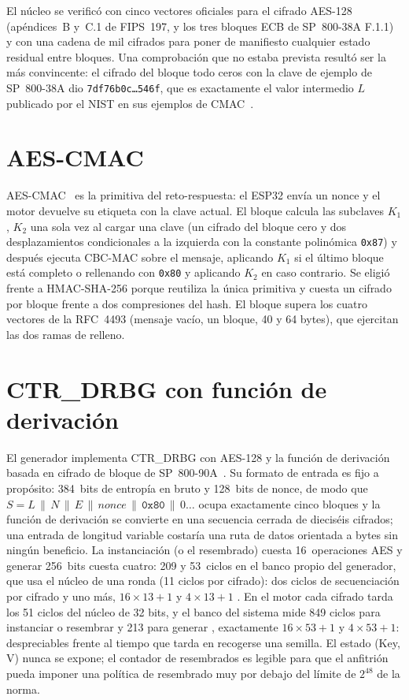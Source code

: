 El núcleo se verificó con cinco vectores oficiales para
el cifrado AES-128 (apéndices~B y~C.1 de FIPS~197, y los tres bloques ECB
de SP~800-38A F.1.1) y con una cadena de mil cifrados para poner de
manifiesto cualquier estado residual entre bloques. Una comprobación que
no estaba prevista resultó ser la más convincente: el cifrado del bloque
todo ceros con la clave de ejemplo de SP~800-38A dio
\texttt{7df76b0c\ldots546f}, que es exactamente el valor intermedio $L$
publicado por el NIST en sus ejemplos de CMAC~\cite{nist_cmac_examples}.

\section{AES-CMAC}
\label{sec:cmac}

AES-CMAC~\cite{nist_2016_sp80038b, song_2006_rfc4493} es la primitiva del
reto-respuesta: el ESP32 envía un nonce y el motor devuelve su
etiqueta con la clave actual. El bloque calcula las subclaves $K_1$,
$K_2$ una sola vez al cargar una clave (un cifrado del bloque cero y dos
desplazamientos condicionales a la izquierda con la constante polinómica
\texttt{0x87}) y después ejecuta CBC-MAC sobre el mensaje, aplicando
$K_1$ si el último bloque está completo o rellenando con \texttt{0x80} y
aplicando $K_2$ en caso contrario. Se eligió frente a HMAC-SHA-256 porque
reutiliza la única primitiva y cuesta un cifrado por bloque frente a dos
compresiones del hash. El bloque supera los cuatro vectores de la
RFC~4493 (mensaje vacío, un bloque, 40 y 64 bytes), que ejercitan las dos
ramas de relleno.

\section{CTR\_DRBG con función de derivación}
\label{sec:drbg}

El generador implementa CTR\_DRBG con AES-128 y la función de derivación
basada en cifrado de bloque de SP~800-90A~\cite{barker_2015_sp80090ar1}.
Su formato de entrada es fijo a propósito: 384~bits de entropía en bruto
y 128~bits de nonce, de modo que $S = L\,\|\,N\,\|\,E\,\|\,\mathit{nonce}\,\|\,\texttt{0x80}\,\|\,0\ldots$
ocupa exactamente cinco bloques y la función de derivación se convierte
en una secuencia cerrada de dieciséis cifrados; una entrada de longitud
variable costaría una ruta de datos orientada a bytes sin ningún
beneficio. La instanciación (o el resembrado) cuesta 16~operaciones AES
y generar 256~bits cuesta cuatro: 209 y 53~ciclos en el banco propio del
generador, que usa el núcleo de una ronda (11 ciclos por cifrado): dos
ciclos de secuenciación por cifrado y uno más, $16 \times 13 + 1$ y
$4 \times 13 + 1$ \simu{}. En el motor cada cifrado tarda los 51 ciclos
del núcleo de 32 bits, y el banco del sistema mide 849 ciclos para
instanciar o resembrar y 213 para generar \simu{}, exactamente
$16 \times 53 + 1$ y $4 \times 53 + 1$: despreciables frente al tiempo
que tarda en recogerse una semilla.
El estado (Key, V)
nunca se expone; el contador de resembrados es legible para que el
anfitrión pueda imponer una política de resembrado muy por debajo del
límite de $2^{48}$ de la norma.

